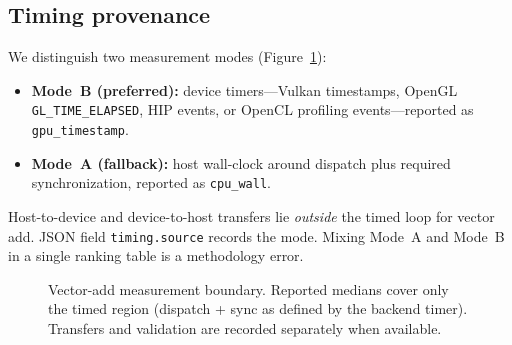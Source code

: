 \documentclass[11pt,a4paper]{article}
\begin{document}
\subsection{Timing provenance}

We distinguish two measurement modes (Figure~\ref{fig:timing}):
\begin{itemize}
  \item \textbf{Mode~B (preferred):} device timers---Vulkan timestamps,
        OpenGL \texttt{GL\_TIME\_ELAPSED}, HIP events, or OpenCL profiling
        events---reported as \texttt{gpu\_timestamp}.
  \item \textbf{Mode~A (fallback):} host wall-clock around dispatch plus
        required synchronization, reported as \texttt{cpu\_wall}.
\end{itemize}
Host-to-device and device-to-host transfers lie \emph{outside} the timed
loop for vector add. JSON field \texttt{timing.source} records the mode.
Mixing Mode~A and Mode~B in a single ranking table is a methodology error.

\begin{figure}[htbp]
\centering
{}
\caption{Vector-add measurement boundary. Reported medians cover only the
timed region (dispatch + sync as defined by the backend timer). Transfers
and validation are recorded separately when available.}
\label{fig:timing}
\end{figure}
\end{document}
